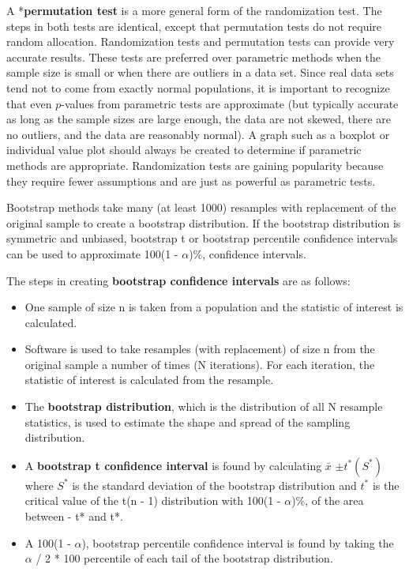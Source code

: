 \documentclass[
]{book}
\providecommand{\tightlist}{%
  \setlength{\itemsep}{0pt}\setlength{\parskip}{0pt}}
\begin{document}
A *\textbf{permutation test} is a more general form of the randomization test. The steps in both tests are identical, except that permutation tests do not require random allocation. Randomization tests and permutation tests can provide very accurate results. These tests are preferred over parametric methods when the sample size is small or when there are outliers in a data set. Since real data sets tend not to come from exactly normal populations, it is important to recognize that even \(p\)-values from parametric tests are approximate (but typically accurate as long as the sample sizes are large enough, the data are not skewed, there are no outliers, and the data are reasonably normal). A graph such as a boxplot or individual value plot should always be created to determine if parametric methods are appropriate. Randomization tests are gaining popularity because they require fewer assumptions and are just as powerful as parametric tests.

Bootstrap methods take many (at least 1000) resamples with replacement of the original sample to create a bootstrap distribution. If the bootstrap distribution is symmetric and unbiased, bootstrap t or bootstrap percentile confidence intervals can be used to approximate 100(1 - \(\alpha\))\%, confidence intervals.

The steps in creating \textbf{bootstrap confidence intervals} are as follows:

\begin{itemize}
\tightlist
\item
  One sample of size n is taken from a population and the statistic of interest is calculated.
\item
  Software is used to take resamples (with replacement) of size n from the original sample a number of times (N iterations). For each iteration, the statistic of interest is calculated from the resample.
\item
  The \textbf{bootstrap distribution}, which is the distribution of all N resample statistics, is used to estimate
  the shape and spread of the sampling distribution.
\item
  A \textbf{bootstrap t confidence interval} is found by calculating \(\bar{x}\) \(\pm t^*(S^*)\) where \(S^*\) is the standard
  deviation of the bootstrap distribution and \(t^*\) is the critical value of the t(n - 1) distribution with
  100(1 - \(\alpha\))\%, of the area between - t* and t*.
\item
  A 100(1 - \(\alpha\)), bootstrap percentile confidence interval is found by taking the \(\alpha\) / 2 * 100 percentile of each tail of the bootstrap distribution.
\end{itemize}
\end{document}
